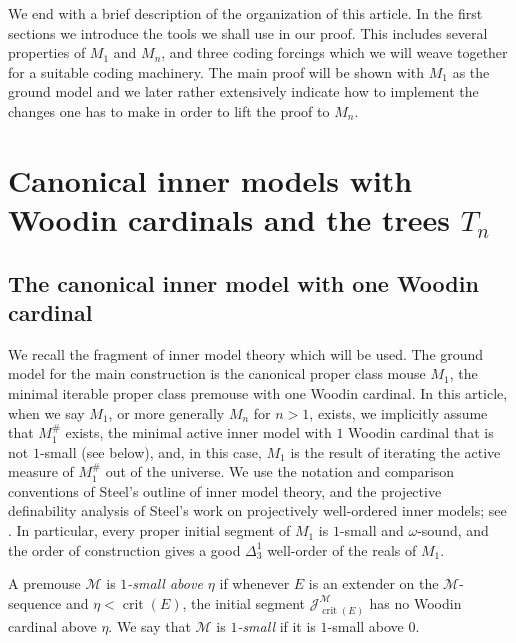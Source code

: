 \documentclass[a4paper,11pt]{article}
\begin{document}
We end with a brief description of the organization of this article. In the first sections we introduce the tools we shall use in our proof. This includes several properties of $M_1$ and $M_n$, and three coding forcings which we will weave together for a suitable coding machinery. The main proof will be shown with $M_1$ as the ground model and we later rather extensively indicate how to implement the changes one has to make in order to lift the proof to $M_n$. 





\section{Canonical inner models with Woodin cardinals and the trees $T_n$}\label{sec:canonical-inner-models}

\subsection{The canonical inner model with one Woodin cardinal}\label{subsec:m1-background}

We recall the fragment of inner model theory which will be used.  The ground model for the main construction is the canonical proper class mouse $M_1$, the minimal iterable proper class premouse with one Woodin cardinal. In this article, when we say $M_1$, or more generally $M_n$ for $n>1$, exists, we implicitly assume that $M_1^\#$ exists, the minimal active inner model with $1$ Woodin cardinal that is not $1$-small (see below), and, in this case, $M_1$ is the result of iterating the active measure of $M_1^\#$ out of the universe.  We use the notation and comparison conventions of Steel's outline of inner model theory, and the projective definability analysis of Steel's work on projectively well-ordered inner models; see \cite{Steel3,Steel2}.  In particular, every proper initial segment of $M_1$ is $1$-small and $\omega$-sound, and the order of construction gives a good $\Delta^1_3$ well-order of the reals of $M_1$.

A premouse $\mathcal M$ is \emph{$1$-small above $\eta$} if whenever $E$ is an extender on the $\mathcal M$-sequence and $\eta<\operatorname{crit}(E)$, the initial segment $\mathcal J^{\mathcal M}_{\operatorname{crit}(E)}$ has no Woodin cardinal above $\eta$.  We say that $\mathcal M$ is \emph{$1$-small} if it is $1$-small above $0$.
\end{document}
